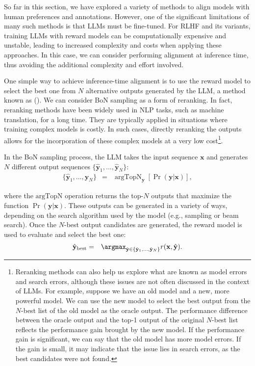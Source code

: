 \noindent So far in this section, we have explored a variety of methods to align models with human preferences and annotations. However, one of the significant limitations of many such methods is that LLMs must be fine-tuned. For RLHF and its variants, training LLMs with reward models can be computationally expensive and unstable, leading to increased complexity and costs when applying these approaches. In this case, we can consider performing alignment at inference time, thus avoiding the additional complexity and effort involved.

One simple way to achieve inference-time alignment is to use the reward model to select the best one from $N$ alternative outputs generated by the LLM, a method known as  (). We can consider BoN sampling as a form of reranking. In fact, reranking methods have been widely used in NLP tasks, such as machine translation, for a long time. They are typically applied in situations where training complex models is costly. In such cases, directly reranking the outputs allows for the incorporation of these complex models at a very low cost\footnote{Reranking methods can also help us explore what are known as model errors and search errors, although these issues are not often discussed in the context of LLMs. For example, suppose we have an old model and a new, more powerful model. We can use the new model to select the best output from the $N$-best list of the old model as the oracle output. The performance difference between the oracle output and the top-1 output of the original $N$-best list reflects the performance gain brought by the new model. If the performance gain is significant, we can say that the old model has more model errors. If the gain is small, it may indicate that the issue lies in search errors, as the best candidates were not found.}.

In the BoN sampling process, the LLM takes the input sequence $\mathbf{x}$ and generates $N$ different output sequences $\{\hat{\mathbf{y}}_1,...,\hat{\mathbf{y}}_N\}$:
\begin{eqnarray}
\{\hat{\mathbf{y}}_1,...,\hat{\mathbf{y}}_N\} & = & \mathop{\mathrm{argTopN}}_{\mathbf{y}} \left[ \Pr(\mathbf{y}|\mathbf{x}) \right],
\end{eqnarray}

\noindent where the $\mathrm{argTopN}$ operation returns the top-$N$ outputs that maximize the function $\Pr(\mathbf{y}|\mathbf{x})$. These outputs can be generated in a variety of ways, depending on the search algorithm used by the model (e.g., sampling or beam search). Once the $N$-best output candidates are generated, the reward model is used to evaluate and select the best one:
\begin{eqnarray}
\hat{\mathbf{y}}_{\mathrm{best}} & = & \argmax_{\hat{\mathbf{y}} \in \{\hat{\mathbf{y}}_1,\ldots,\hat{\mathbf{y}}_N\}} r(\mathbf{x},\hat{\mathbf{y}}).
\end{eqnarray}

